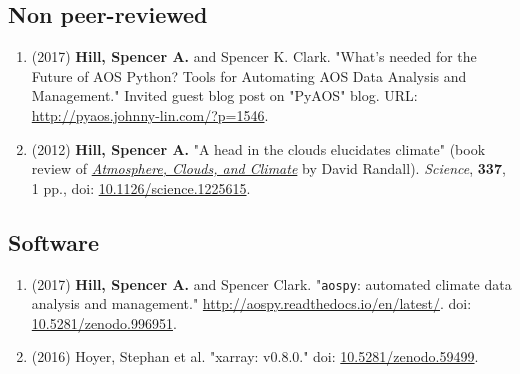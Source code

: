 \documentclass[12pt,letterpaper]{shillcv}
\begin{document}
\subsection*{Non peer-reviewed}
\label{sec:orgf164804}
\begin{enumerate}
\item (2017) \textbf{Hill, Spencer A.} and Spencer K. Clark.  "What’s needed for the Future
of AOS Python? Tools for Automating AOS Data Analysis and Management."
Invited guest blog post on "PyAOS" blog.  URL:
\url{http://pyaos.johnny-lin.com/?p=1546}.
\item (2012) \textbf{Hill, Spencer A.}  "A head in the clouds elucidates climate" (book
review of \href{http://press.princeton.edu/titles/9773.html}{\emph{Atmosphere, Clouds, and Climate}} by David Randall). \emph{Science}, \textbf{337},
1 pp., doi: \href{http://dx.doi.org/10.1126/science.1225615}{10.1126/science.1225615}.
\end{enumerate}
\subsection*{Software}
\label{sec:org2e2079d}
\begin{enumerate}
\item (2017) \textbf{Hill, Spencer A.} and Spencer Clark.  "\texttt{aospy}: automated climate data
analysis and management."  \url{http://aospy.readthedocs.io/en/latest/}.  doi:
\href{https://doi.org/10.5281/zenodo.996951}{10.5281/zenodo.996951}.
\item (2016) Hoyer, Stephan et al.  "xarray: v0.8.0."  doi: \href{https://doi.org/10.5281/zenodo.59499}{10.5281/zenodo.59499}.
\end{enumerate}
\end{document}
